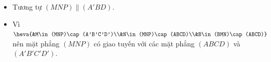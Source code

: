 \begin{ex}
{\begin{itemize}
\begin{center}
	\end{center}
	Tương tự, $IM$ là đường trung bình của tam giác $A'B'D'$ nên $\heva{&I M\parallel  A'D'\\ & I M=\dfrac 12A'D'}$\\
	$\Rightarrow\heva{&I M \parallel  CN \\& IM=CN}$. Do vậy $IMNC$ là hình bình hành.\\
	Suy ra $\heva{& MN\parallel  IC\\ & IC\subset(B'D'C)}
	\Rightarrow MN\parallel(B'D'C)$.(2)\\
	Từ (1) và (2) suy ra $(MNP)\parallel(B'D'C)$.
	\item Tương tự $(MNP)\parallel(A'BD)$.
	\item Vì $\heva{&M\in(MNP)\cap (A'B'C'D')\\&N\in(MNP)\cap (ABCD)\\&B\in(BMN)\cap (ABCD)}$ nên mặt phẳng $(MNP)$ có giao tuyến với các mặt phẳng $(ABCD)$ và $(A'B'C'D')$.
		\end{itemize}
}
\end{ex}
